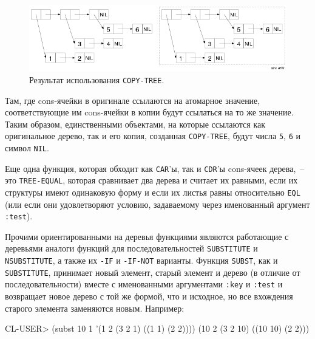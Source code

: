 \begin{figure}[h]
  \centering
  \includegraphics[scale=0.6]{images/copy-tree-list-or-tree.png}
  \caption{Результат использования \lstinline{COPY-TREE}.}
  \label{fig:13-3}
\end{figure}

Там, где cons-ячейки в оригинале ссылаются на атомарное значение, соответствующие им
cons-ячейки в копии будут ссылаться на то же значение.  Таким образом, единственными
объектами, на которые ссылаются как оригинальное дерево, так и его копия, созданная
\lstinline{COPY-TREE}, будут числа \lstinline{5}, \lstinline{6} и символ \lstinline{NIL}.

Еще одна функция, которая обходит как \lstinline{CAR}'ы, так и \lstinline{CDR}'ы cons-ячеек дерева,~--
это \lstinline{TREE-EQUAL}, которая сравнивает два дерева и считает их равными, если их
структуры имеют одинаковую форму и если их листья равны относительно \lstinline{EQL} (или если
они удовлетворяют условию, задаваемому через именованный аргумент \lstinline{:test}).

Прочими ориентированными на деревья функциями являются работающие с деревьями аналоги
функций для последовательностей \lstinline{SUBSTITUTE} и \lstinline{NSUBSTITUTE}, а также их \lstinline{-IF} и
\lstinline{-IF-NOT} варианты. Функция \lstinline{SUBST}, как и \lstinline{SUBSTITUTE}, принимает новый
элемент, старый элемент и дерево (в отличие от последовательности) вместе с именованными
аргументами \lstinline{:key} и \lstinline{:test} и возвращает новое дерево с той же формой, что и
исходное, но все вхождения старого элемента заменяются новым. Например:

\begin{myverb}
CL-USER> (subst 10 1 '(1 2 (3 2 1) ((1 1) (2 2))))
(10 2 (3 2 10) ((10 10) (2 2)))
\end{myverb}

